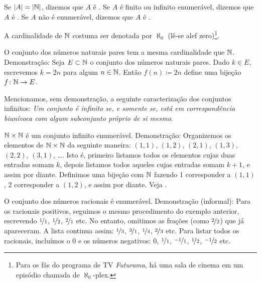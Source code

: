 \begin{defn}
Se $\lvert {A} \rvert = \lvert {{\mathbb{N}}} \rvert$, dizemos que $A$ é
\emph{}.
Se $A$ é finito ou infinito enumerável, dizemos que $A$
é \emph{}.
Se $A$ não é enumerável,
dizemos que $A$ é \emph{}.
\end{defn}

A cardinalidade de ${\mathbb{N}}$ costuma ser denotada por
$\aleph_0$ (lê-se alef zero)\footnote{Para os fãs do programa de TV
\emph{Futurama}, há uma sala de cinema em um episódio
chamada de $\aleph_0$-plex.}.

\begin{example}
O conjunto dos números naturais pares tem a mesma cardinalidade que ${\mathbb{N}}$.
Demonstração: Seja $E \subset {\mathbb{N}}$ o conjunto dos números naturais pares.
Dado $k \in E$, escrevemos $k=2n$ para algum $n \in {\mathbb{N}}$.
Então $f(n) \coloneqq 2n$ define uma bijeção $f \colon {\mathbb{N}} \to E$.
\end{example}

Mencionamos, sem demonstração, a seguinte caracterização dos conjuntos
infinitos: \emph{Um conjunto é infinito se, e somente se, está em
correspondência biunívoca com algum subconjunto próprio de si mesmo}.

\begin{example}
$\N \times \N$ é um conjunto infinito enumerável. Demonstração: Organizemos
os elementos de $\N \times \N$ da seguinte maneira:
$(1,1)$, $(1,2)$, $(2,1)$, $(1,3)$, $(2,2)$, $(3,1)$, \ldots. Isto é,
primeiro listamos todos os elementos cujas duas entradas somam $k$,
depois listamos todos aqueles cujas entradas somam $k+1$, e assim por diante.
Definimos uma bijeção com ${\mathbb{N}}$ fazendo 1 corresponder a $(1,1)$,
2 corresponder a $(1,2)$, e assim por diante. Veja .
\begin{myfigureht}
\caption{Mostrando que $\N \times \N$ é enumerável.\label{fig:NcrossNcard}}
\end{myfigureht}
\end{example}

\begin{example}
O conjunto dos números racionais é enumerável. Demonstração (informal):
Para os racionais positivos, seguimos o mesmo procedimento do exemplo
anterior, escrevendo
$\nicefrac{1}{1}$, $\nicefrac{1}{2}$, $\nicefrac{2}{1}$ etc. No entanto,
omitimos as frações (como $\nicefrac{2}{2}$)
que já apareceram. A lista continua assim:
$\nicefrac{1}{3}$, $\nicefrac{3}{1}$, $\nicefrac{1}{4}$,
$\nicefrac{2}{3}$ etc.
Para listar todos os racionais, incluímos o $0$ e os números negativos:
$0$,
$\nicefrac{1}{1}$,
$\nicefrac{-1}{1}$,
$\nicefrac{1}{2}$,
$\nicefrac{-1}{2}$ etc.
\end{example}

